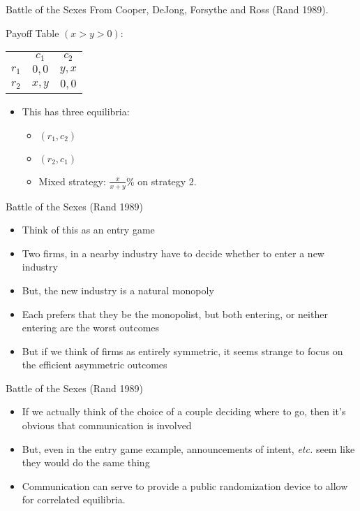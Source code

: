\documentclass{beamer}
\begin{document}
\begin{frame}{Battle of the Sexes}
From Cooper, DeJong, Forsythe and Ross (Rand 1989).
\begin{center}
Payoff Table $(x>y>0)$:

		\begin{tabular}{r|c|c|}
				\multicolumn{1}{r}{}& \multicolumn{1}{c}{$c_1$}  & \multicolumn{1}{c}{$c_2$} \\ \cline{2-3}
				$r_1$ &  $0,0$ & $y,x$ \\ \cline{2-3}
				$r_2$ &  $x,y$ & $0,0$ \\ \cline{2-3}
				\end{tabular}
\end{center}

	\begin{itemize}
		\item This has three equilibria:
			\begin{itemize}
				\item $(r_1,c_2)$
				\item $(r_2,c_1)$
				\item Mixed strategy: $\tfrac{x}{x+y}$\% on strategy 2.
			\end{itemize}
	\end{itemize}
\end{frame}

\begin{frame}{Battle of the Sexes (Rand 1989)}
	\begin{itemize}
		\item Think of this as an entry game
		\item Two firms, in a nearby industry have to decide whether to enter a new industry
		\item But, the new industry is a natural monopoly
		\item Each prefers that they be the monopolist, but both entering, or neither entering are the worst outcomes
		\item But if we think of firms as entirely symmetric, it seems strange to focus on the efficient asymmetric outcomes
	\end{itemize}
\end{frame}

\begin{frame}{Battle of the Sexes (Rand 1989)}
	\begin{itemize}
		\item If we actually think of the choice of a couple deciding where to go, then it's obvious that communication is involved
		\item But, even in the entry game example, announcements of intent, \emph{etc.} seem like they would do the same thing
		\item Communication can serve to provide a public randomization device to allow for correlated equilibria.
	\end{itemize}
\end{frame}
\end{document}
